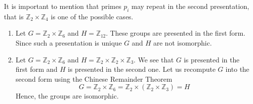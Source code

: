 It is important to mention that primes $p_i$ may repeat in the second presentation, that is $\mathbb Z_2\times \mathbb Z_4$ is one of the possible cases.

\begin{examples}
\begin{enumerate}
\item Let $G = \mathbb Z_2 \times \mathbb Z_6$ and $H = \mathbb Z_{12}$.
These groups are presented in the first form.
Since such a presentation is unique $G$ and $H$ are not isomorphic.

\item Let $G = \mathbb Z_2 \times \mathbb Z_6$ and $H = \mathbb Z_2\times \mathbb Z_2\times \mathbb Z_3$.
We see that $G$ is presented in the first form and $H$ is presented in the second one.
Let us recompute $G$ into the second form using the Chinese Remainder Theorem
\[
G = \mathbb Z_2 \times \mathbb Z_6 = \mathbb Z_2 \times (\mathbb Z_2 \times \mathbb Z_3) = H
\]
Hence, the groups are isomorphic.
\end{enumerate}
\end{examples}

